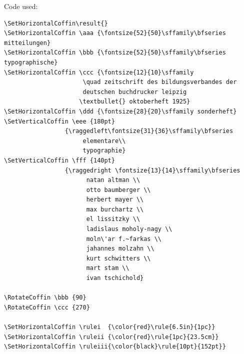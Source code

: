 \documentclass{article}
\begin{document}
\vspace*{3cm}
\begin{center}
  {\Large Code used: \par}
\vspace*{1cm}


\begin{minipage}{14cm}
\begin{verbatim}
\SetHorizontalCoffin\result{}
\SetHorizontalCoffin \aaa {\fontsize{52}{50}\sffamily\bfseries mitteilungen}
\SetHorizontalCoffin \bbb {\fontsize{52}{50}\sffamily\bfseries typographische}
\SetHorizontalCoffin \ccc {\fontsize{12}{10}\sffamily 
                      \quad zeitschrift des bildungsverbandes der
                      deutschen buchdrucker leipzig 
                     \textbullet{} oktoberheft 1925}
\SetHorizontalCoffin \ddd {\fontsize{28}{20}\sffamily sonderheft}
\SetVerticalCoffin \eee {180pt}
                 {\raggedleft\fontsize{31}{36}\sffamily\bfseries 
                      elementare\\
                      typographie}
\SetVerticalCoffin \fff {140pt}
                 {\raggedright \fontsize{13}{14}\sffamily\bfseries 
                       natan altman \\
                       otto baumberger \\
                       herbert mayer \\
                       max burchartz \\
                       el lissitzky \\
                       ladislaus moholy-nagy \\
                       moln\'ar f.~farkas \\
                       jahannes molzahn \\
                       kurt schwitters \\
                       mart stam \\
                       ivan tschichold}
     
\RotateCoffin \bbb {90}
\RotateCoffin \ccc {270}

\SetHorizontalCoffin \rulei  {\color{red}\rule{6.5in}{1pc}}
\SetHorizontalCoffin \ruleii {\color{red}\rule{1pc}{23.5cm}}
\SetHorizontalCoffin \ruleiii{\color{black}\rule{10pt}{152pt}}


\end{verbatim}
\end{minipage}
\end{center}
\end{document}
